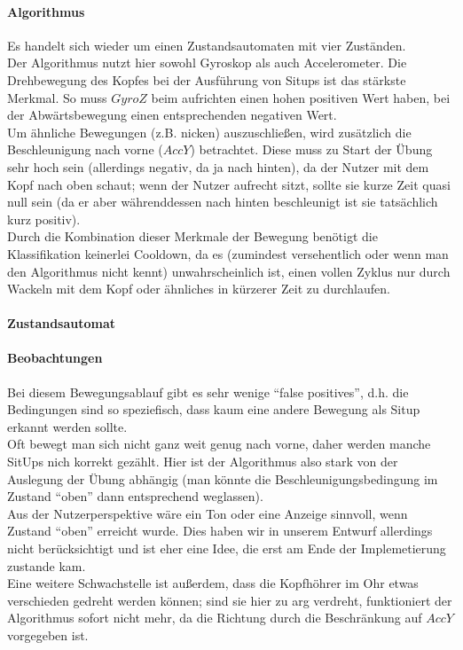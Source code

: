 \documentclass[a4paper,12pt]{article}
\begin{document}
\paragraph{Algorithmus}
Es handelt sich wieder um einen Zustandsautomaten mit vier Zuständen.\\
Der Algorithmus nutzt hier sowohl Gyroskop als auch Accelerometer. Die Drehbewegung des Kopfes bei der Ausführung von Situps ist das stärkste Merkmal. So muss $GyroZ$ beim aufrichten einen hohen positiven Wert haben, bei der Abwärtsbewegung einen entsprechenden negativen Wert.\\
Um ähnliche Bewegungen (z.B. nicken) auszuschließen, wird zusätzlich die Beschleunigung nach vorne ($AccY$) betrachtet. Diese muss zu Start der Übung sehr hoch sein (allerdings negativ, da ja nach hinten), da der Nutzer mit dem Kopf nach oben schaut; wenn der Nutzer aufrecht sitzt, sollte sie kurze Zeit quasi null sein (da er aber währenddessen nach hinten beschleunigt ist sie tatsächlich kurz positiv).\\
Durch die Kombination dieser Merkmale der Bewegung benötigt die Klassifikation keinerlei Cooldown, da es (zumindest versehentlich oder wenn man den Algorithmus nicht kennt) unwahrscheinlich ist, einen vollen Zyklus nur durch Wackeln mit dem Kopf oder ähnliches in kürzerer Zeit zu durchlaufen.
\paragraph{Zustandsautomat}

\paragraph{Beobachtungen}
Bei diesem Bewegungsablauf gibt es sehr wenige ``false positives'', d.h. die Bedingungen sind so speziefisch, dass kaum eine andere Bewegung als Situp erkannt werden sollte.\\
Oft bewegt man sich nicht ganz weit genug nach vorne, daher werden manche SitUps nich korrekt gezählt. Hier ist der Algorithmus also stark von der Auslegung der Übung abhängig (man könnte die Beschleunigungsbedingung im Zustand ``oben'' dann entsprechend weglassen).\\
Aus der Nutzerperspektive wäre ein Ton oder eine Anzeige sinnvoll, wenn Zustand ``oben'' erreicht wurde. Dies haben wir in unserem Entwurf allerdings nicht berücksichtigt und ist eher eine Idee, die erst am Ende der Implemetierung zustande kam.\\
Eine weitere Schwachstelle ist außerdem, dass die Kopfhöhrer im Ohr etwas verschieden gedreht werden können; sind sie hier zu arg verdreht, funktioniert der Algorithmus sofort nicht mehr, da die Richtung durch die Beschränkung auf $AccY$ vorgegeben ist.
\end{document}

